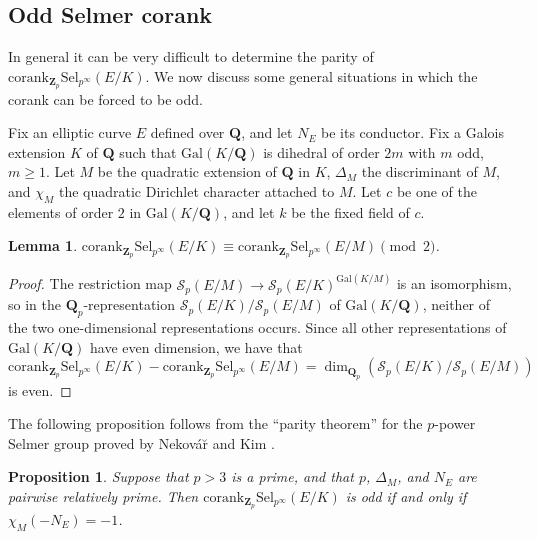 \documentclass[reqno]{amsart}
\newtheorem{lem}[thm]{Lemma}
\newtheorem{prop}[thm]{Proposition}
\theoremstyle{definition}
\def\Z{\mathbf{Z}}
\def\Q{\mathbf{Q}}
\def\Zp{\Z_p}
\def\Qp{\Q_p}
\def\cS{\mathcal{S}}
\def\Gal{\mathrm{Gal}}
\def\cork{\mathrm{corank}}
\def\Sel{\mathrm{Sel}}
\def\Scp{\cS_p}
\def\k{k}
\begin{document}
\subsection{Odd Selmer corank}

In general it can be very difficult to determine the 
parity of $\cork_{\Zp}\Sel_{p^\infty}(E/K)$.  We now discuss some 
general situations in which the corank can be forced to be odd.

Fix an elliptic curve $E$ defined over $\Q$, and let $N_E$ be its 
conductor.  
Fix a Galois extension $K$ of $\Q$ such that $\Gal(K/\Q)$ 
is dihedral of order $2m$ with $m$ odd, $m \ge 1$.
Let $M$ be the quadratic extension of $\Q$ in $K$, $\Delta_M$ 
the discriminant of $M$, and $\chi_M$ 
the quadratic Dirichlet character attached to $M$.  
Let $c$ be one of the elements of order $2$ in $\Gal(K/\Q)$, 
and let $\k$ be the fixed field of $c$.  

\begin{lem}
\label{dclem}
$\cork_{\Zp}\Sel_{p^\infty}(E/K) \equiv \cork_{\Zp}\Sel_{p^\infty}(E/M) \pmod{2}$.
\end{lem}

\begin{proof}
The restriction map $\Scp(E/M) \to \Scp(E/K)^{\Gal(K/M)}$ is an isomorphism, so 
in the $\Qp$-representation $\Scp(E/K)/\Scp(E/M)$ of $\Gal(K/\Q)$, neither of 
the two one-dimensional representations occurs.  Since all other representations 
of $\Gal(K/\Q)$ have even dimension, we have that 
$$
\cork_{\Zp}\Sel_{p^\infty}(E/K) - \cork_{\Zp}\Sel_{p^\infty}(E/M) 
    = \dim_{\Qp}(\Scp(E/K)/\Scp(E/M))
$$ 
is even.
\end{proof}

The following proposition follows from the ``parity theorem'' for the 
$p$-power Selmer group proved by Nekov\'a\u{r} \cite{nekovarpc} and Kim \cite{kim}.

\begin{prop}
\label{selpar}
Suppose that $p > 3$ is a prime, and that $p$, $\Delta_M$, and $N_E$ 
are pairwise relatively prime.  Then 
$\cork_{\Zp}\Sel_{p^\infty}(E/K)$ is odd if and only if $\chi_M(-N_E) = -1$.
\end{prop}
\end{document}
